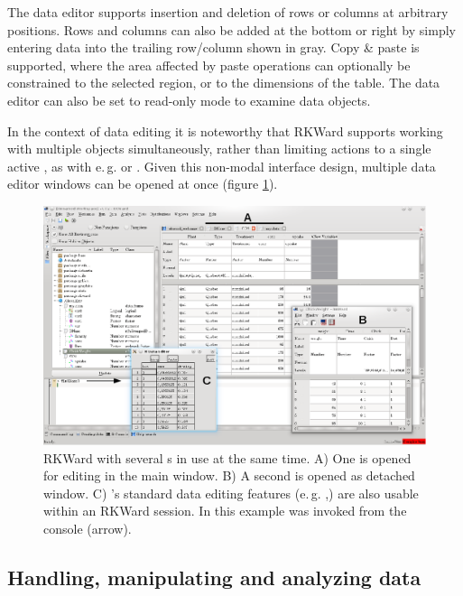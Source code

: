 The data editor supports insertion and deletion of rows or columns at
arbitrary positions. Rows and columns can also be added at the bottom or
right by simply entering data into the trailing row/column shown in
gray. Copy \& paste is supported, where the area affected by paste
operations can optionally be constrained to the selected region, or to
the dimensions of the table. The data editor can also be set to read-only
mode to examine data objects.

In the context of data editing it is noteworthy that
RKWard supports working with multiple objects simultaneously, rather than
limiting actions to a single active , as with e.\,g.  or
. Given this non-modal interface design, multiple data editor
windows can be opened at once (figure \ref{fig:data_editors}).

\begin{figure}[htp]
 \centering
 \includegraphics{../figures/data_editors.png}
 \caption{RKWard with several s in use at the same time. A) One  is opened for editing in the 
 main window. B) A second  is opened as detached window. C) 's standard data editing features 
(e.\,g. ,) are also usable within an RKWard session. 
In this example  was invoked from the console (arrow).}
 \label{fig:data_editors}
\end{figure}

\subsection{Handling, manipulating and analyzing data}
\label{sec:analyzing_data}

